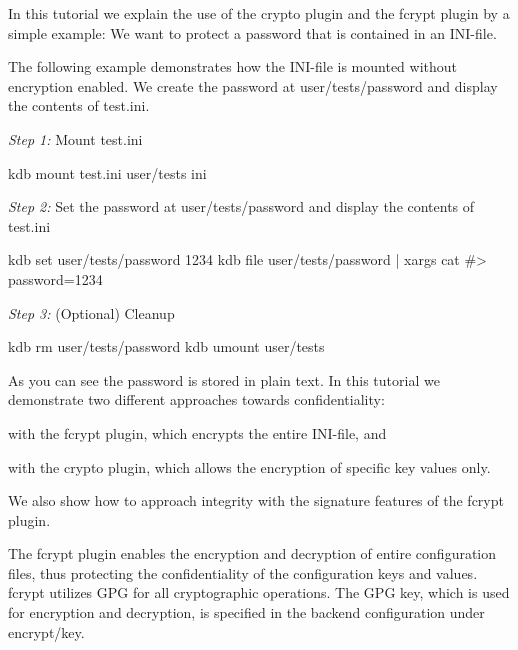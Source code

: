 In this tutorial we explain the use of the {\ttfamily crypto} plugin and the {\ttfamily fcrypt} plugin by a simple example\+: We want to protect a password that is contained in an I\+N\+I-\/file.

The following example demonstrates how the I\+N\+I-\/file is mounted without encryption enabled. We create the password at {\ttfamily user/tests/password} and display the contents of {\ttfamily test.\+ini}.

{\itshape Step 1\+:} Mount {\ttfamily test.\+ini}


\begin{DoxyCode}
kdb mount test.ini user/tests ini
\end{DoxyCode}


{\itshape Step 2\+:} Set the password at {\ttfamily user/tests/password} and display the contents of {\ttfamily test.\+ini}


\begin{DoxyCode}
kdb set user/tests/password 1234
kdb file user/tests/password | xargs cat
#> password=1234
\end{DoxyCode}


{\itshape Step 3\+:} (Optional) Cleanup


\begin{DoxyCode}
kdb rm user/tests/password
kdb umount user/tests
\end{DoxyCode}


As you can see the password is stored in plain text. In this tutorial we demonstrate two different approaches towards confidentiality\+:


\begin{DoxyEnumerate}
\item with the {\ttfamily fcrypt} plugin, which encrypts the entire I\+N\+I-\/file, and
\item with the {\ttfamily crypto} plugin, which allows the encryption of specific key values only.
\end{DoxyEnumerate}

We also show how to approach integrity with the signature features of the {\ttfamily fcrypt} plugin.

The {\ttfamily fcrypt} plugin enables the encryption and decryption of entire configuration files, thus protecting the confidentiality of the configuration keys and values. {\ttfamily fcrypt} utilizes G\+PG for all cryptographic operations. The G\+PG key, which is used for encryption and decryption, is specified in the backend configuration under {\ttfamily encrypt/key}.


